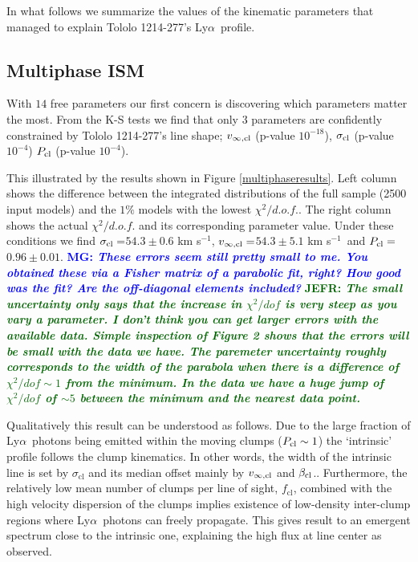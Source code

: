 \documentclass[a4,useAMS,usenatbib,usegraphicx]{mn2e}
\newcommand{\tol}{Tololo 1214-277}
\newcommand{\lya}{\ifmmode{{\rm Ly}\alpha}\else Ly$\alpha$\ \fi}
\newcommand{\sigmaclump}{$54.3\pm 0.6$ km s$^{-1}$}
\newcommand{\inftyclump}{$54.3\pm 5.1$ km s$^{-1}$}
\newcommand{\probaclump}{$0.96\pm 0.01$}
\newcommand{\mg}[1]{\textcolor{blue}{\bf MG: \textit{#1}}}
\newcommand{\jefr}[1]{\textcolor{darkgreen}{\bf JEFR: \textit{#1}}}
\begin{document}
In what follows we summarize the values of the kinematic parameters
that managed to explain \tol's \lya profile.


\subsection{Multiphase ISM}

With $14$ free parameters our first concern is discovering which 
parameters matter the most.
From the K-S tests we find that only 3 parameters 
are confidently constrained by \tol's line shape;
$v_{\infty,\rm{cl}}$ (p-value  $10^{-18}$), $\sigma_{\rm cl}$ (p-value
$10^{-4}$) $P_{\rm cl}$ (p-value $10^{-4}$). 

This illustrated by the results shown in Figure \ref{multiphaseresults}.
Left column shows the difference between the integrated distributions
of the full sample (2500 input models) and the $1\%$ models with the lowest
$\chi^2/d.o.f.$.  
The right column shows the actual $\chi^2/d.o.f.$ 
and its corresponding parameter value. 
Under these conditions we find $\sigma_{\rm cl}=$\sigmaclump,
$v_{\infty {\rm, cl}}=$\inftyclump\ and $P_{\rm cl}=$\probaclump.
\mg{These errors seem still pretty small to me. You obtained these via a Fisher matrix of a parabolic fit, right? How good was the fit? Are the off-diagonal elements included?}
\jefr{The small uncertainty only says that the increase in
  $\chi^2/dof$ is very steep as you vary a parameter. I don't think you can get larger errors
  with the available data. Simple inspection of Figure 2 shows
  that the errors will be small with the data we have. The
  paremeter uncertainty roughly corresponds to the width of the parabola
  when there is a difference of $\chi^2/dof\sim 1$ from the minimum. In the data we
  have a huge jump of $\chi^2/dof$ of $\sim 5$ between the minimum
  and the nearest data point. }

Qualitatively this result can be understood as follows.
Due to the large fraction of \lya photons being emitted within the
moving clumps ($P_{\rm cl}\sim 1$) the `intrinsic' profile follows 
the clump kinematics. In other words, the width of the intrinsic line
is set by $\sigma_{\mathrm{cl}}$ and its median offset mainly by
$v_{\infty,{\rm cl}}$ and $\beta_{\rm cl}$.. 
Furthermore, the relatively low mean number of clumps per line of
sight, $f_{\mathrm{cl}}$, combined with the high velocity dispersion
of the clumps implies existence of low-density inter-clump 
regions where \lya photons can freely propagate.
This gives result to an emergent spectrum close to the intrinsic one, explaining the high
flux at line center as observed.  
\end{document}
